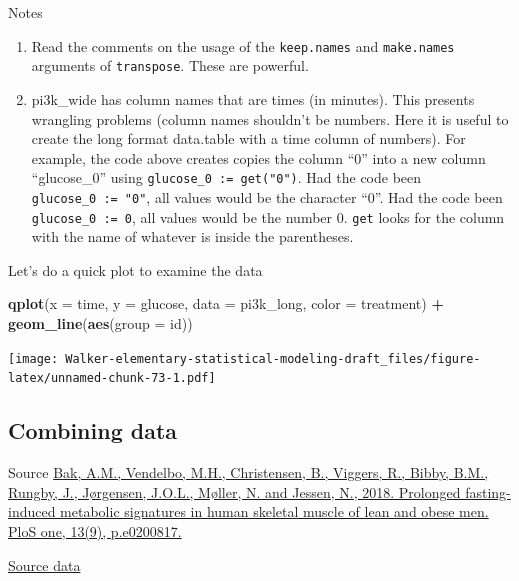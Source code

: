 \documentclass[]{book}
\newenvironment{Shaded}{\begin{snugshade}}{\end{snugshade}}
\newcommand{\DataTypeTok}[1]{\textcolor[rgb]{0.13,0.29,0.53}{#1}}
\newcommand{\KeywordTok}[1]{\textcolor[rgb]{0.13,0.29,0.53}{\textbf{#1}}}
\newcommand{\NormalTok}[1]{#1}
\newcommand{\OperatorTok}[1]{\textcolor[rgb]{0.81,0.36,0.00}{\textbf{#1}}}
\newcommand{\StringTok}[1]{\textcolor[rgb]{0.31,0.60,0.02}{#1}}
\providecommand{\tightlist}{%
  \setlength{\itemsep}{0pt}\setlength{\parskip}{0pt}}
\begin{document}
Notes

\begin{enumerate}
\def\labelenumi{\arabic{enumi}.}
\tightlist
\item
  Read the comments on the usage of the \texttt{keep.names} and \texttt{make.names} arguments of \texttt{transpose}. These are powerful.
\item
  pi3k\_wide has column names that are times (in minutes). This presents wrangling problems (column names shouldn't be numbers. Here it is useful to create the long format data.table with a time column of numbers). For example, the code above creates copies the column ``0'' into a new column ``glucose\_0'' using \texttt{glucose\_0\ :=\ get("0")}. Had the code been \texttt{glucose\_0\ :=\ "0"}, all values would be the character ``0''. Had the code been \texttt{glucose\_0\ :=\ 0}, all values would be the number 0. \texttt{get} looks for the column with the name of whatever is inside the parentheses.
\end{enumerate}

Let's do a quick plot to examine the data

\begin{Shaded}
\begin{Highlighting}[]
\KeywordTok{qplot}\NormalTok{(}\DataTypeTok{x =}\NormalTok{ time,}
      \DataTypeTok{y =}\NormalTok{ glucose,}
      \DataTypeTok{data =}\NormalTok{ pi3k_long,}
      \DataTypeTok{color =}\NormalTok{ treatment) }\OperatorTok{+}
\StringTok{  }\KeywordTok{geom_line}\NormalTok{(}\KeywordTok{aes}\NormalTok{(}\DataTypeTok{group =}\NormalTok{ id))}
\end{Highlighting}
\end{Shaded}

\texttt{[image: Walker-elementary-statistical-modeling-draft\_files/figure-latex/unnamed-chunk-73-1.pdf]}

\hypertarget{combining-data}{%
\subsection{Combining data}\label{combining-data}}

Source \href{https://journals.plos.org/plosone/article?id=10.1371/journal.pone.0200817}{Bak, A.M., Vendelbo, M.H., Christensen, B., Viggers, R., Bibby, B.M., Rungby, J., Jørgensen, J.O.L., Møller, N. and Jessen, N., 2018. Prolonged fasting-induced metabolic signatures in human skeletal muscle of lean and obese men. PloS one, 13(9), p.e0200817.}

\href{https://datadryad.org/stash/dataset/doi:10.5061/dryad.6121hj7}{Source data}
\end{document}
